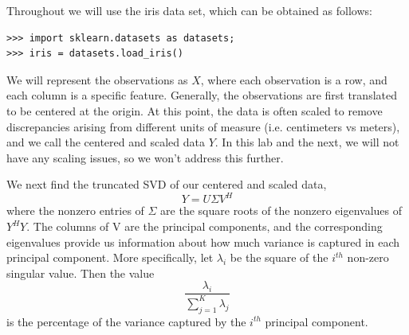 Throughout we will use the iris data set, which can be obtained as follows:
\begin{lstlisting}
>>> import sklearn.datasets as datasets;
>>> iris = datasets.load_iris()
\end{lstlisting}
We will represent the observations as $X$, where each observation is a row, and each column is a specific feature. Generally, the observations are first translated to be centered at the origin. At this point, the data is often scaled to remove discrepancies arising from different units of measure (i.e. centimeters vs meters), and we call the centered and scaled data $Y$. In this lab and the next, we will not have any scaling issues, so we won't address this further. 

We next find the truncated SVD of our centered and scaled data, $$Y = U\Sigma V^{H}$$ where the nonzero entries of $\Sigma$ are the square roots of the nonzero eigenvalues of $Y^{H}Y$. The columns of V are the principal components, and the corresponding eigenvalues provide us information about how much variance is captured in each principal component. More specifically, let $\lambda_{i}$ be the square of the $i^{th}$ non-zero singular value. Then the value $$\frac{\lambda_{i}}{\sum_{j=1}^{K} \lambda_{j}}$$ is the percentage of the variance captured by the $i^{th}$ principal component.

